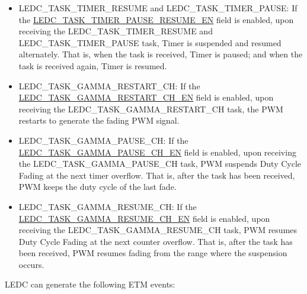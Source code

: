 \documentclass[main\_\_EN.tex]{subfiles}
\begin{document}
\begin{itemize}
\item LEDC\_TASK\_TIMER\_RESUME and LEDC\_TASK\_TIMER\_PAUSE: If the \hyperref[fielddesc:LEDCTASKTIMERNPAUSERESUMEEN]{LEDC\_TASK\_TIMER\_PAUSE\_RESUME\_EN} field is enabled, upon receiving the LEDC\_TASK\_TIMER\_RESUME and LEDC\_TASK\_TIMER\_PAUSE task, Timer is suspended and resumed alternately. That is, when the task is received, Timer is paused; and when the task is received again, Timer is resumed.
\item LEDC\_TASK\_GAMMA\_RESTART\_CH: If the \hyperref[fielddesc:LEDCTASKGAMMARESTARTCHNEN]{LEDC\_TASK\_GAMMA\_RESTART\_CH\_EN} field is enabled, upon receiving the LEDC\_TASK\_GAMMA\_RESTART\_CH task, the PWM restarts to generate the fading PWM signal.
\item LEDC\_TASK\_GAMMA\_PAUSE\_CH: If the \hyperref[fielddesc:LEDCTASKGAMMAPAUSECHNEN]{LEDC\_TASK\_GAMMA\_PAUSE\_CH\_EN} field is enabled, upon receiving the LEDC\_TASK\_GAMMA\_PAUSE\_CH task, PWM suspends Duty Cycle Fading at the next timer overflow. That is, after the task has been received, PWM keeps the duty cycle of the last fade.
\item LEDC\_TASK\_GAMMA\_RESUME\_CH: If the \hyperref[fielddesc:LEDCTASKGAMMARESUMECHNEN]{LEDC\_TASK\_GAMMA\_RESUME\_CH\_EN} field is enabled, upon receiving the LEDC\_TASK\_GAMMA\_RESUME\_CH task, PWM resumes Duty Cycle Fading at the next counter overflow. That is, after the task has been received, PWM resumes fading from the range where the suspension occurs.
\end{itemize}

LEDC can generate the following ETM events:
\end{document}
